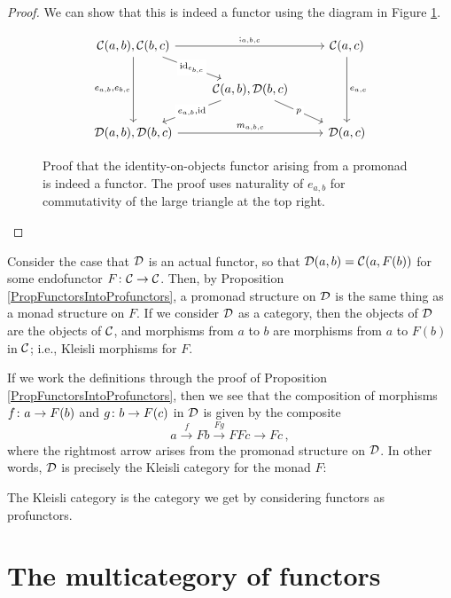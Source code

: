 \documentclass{report}[11pt]
\begin{document}
\begin{proof}
  We can show that this is indeed a functor using the diagram in Figure \ref{FigPromonadFunctorProof}.
  \begin{figure}[hbt]
    \[
      \begin{tikzcd}
        \C(a,b),\C(b,c) \arrow[rr, "{;_{a,b,c}}"] \arrow[dd, "{e_{a,b},e_{b,c}}"'] \arrow[dr, "{\id_{e_{b,c}}}" description]
          &
            & \C(a,c) \arrow[dd, "{e_{a,c}}"] \\
          & \C(a,b),\D(b,c) \arrow[dl, "{e_{a,b},\id}" description] \arrow[dr, "p" description]
            & \\
        \D(a,b),\D(b,c) \arrow[rr, "{m_{a,b,c}}"]
          &
            & \D(a,c)
      \end{tikzcd}
      \]
    \caption{Proof that the identity-on-objects functor arising from a promonad is indeed a functor.  
    The proof uses naturality of $e_{a,b}$ for commutativity of the large triangle at the top right.}
    \label{FigPromonadFunctorProof}
  \end{figure}
\end{proof}

Consider the case that ${\mathcal{D}}$ is an actual functor, so that ${\mathcal{D}}(a,b)={\mathcal{C}}(a,F(b))$ for some endofunctor $F\colon{\mathcal{C}}\to{\mathcal{C}}$.  
Then, by Proposition \ref{PropFunctorsIntoProfunctors}, a promonad structure on ${\mathcal{D}}$ is the same thing as a monad structure on $F$.  
If we consider ${\mathcal{D}}$ as a category, then the objects of ${\mathcal{D}}$ are the objects of ${\mathcal{C}}$, and morphisms from $a$ to $b$ are morphisms from $a$ to $F(b)$ in ${\mathcal{C}}$; i.e., Kleisli morphisms for $F$.

If we work the definitions through the proof of Proposition \ref{PropFunctorsIntoProfunctors}, then we see that the composition of morphisms $f\colon a \to F(b)$ and $g \colon b \to F(c)$ in ${\mathcal{D}}$ is given by the composite
\[
  a \xrightarrow{f}
  Fb \xrightarrow{Fg}
  FFc \to
  Fc\,,
  \]
where the rightmost arrow arises from the promonad structure on ${\mathcal{D}}$.  
In other words, ${\mathcal{D}}$ is precisely the Kleisli category for the monad $F$:

\begin{slogan}
  \label{SlogKleisli}
  The Kleisli category is the category we get by considering functors as profunctors.
\end{slogan}

\section{The multicategory of functors}
\end{document}
